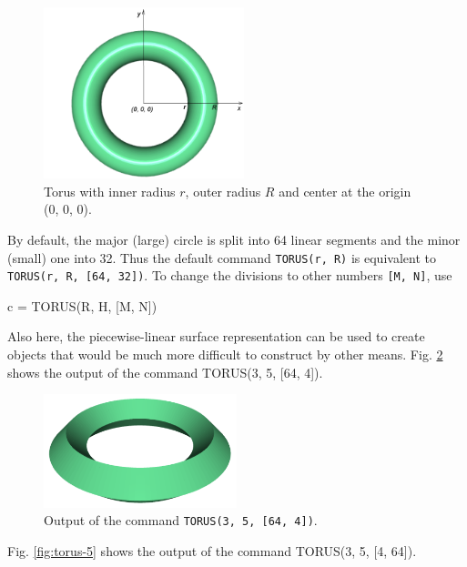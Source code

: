 \begin{figure}[!ht]
\begin{center}
\includegraphics[width=0.52\textwidth]{img/torus-1.png}
\end{center}
\vspace{-4mm}
\caption{Torus with inner radius $r$, outer radius $R$ and center at the origin (0, 0, 0).}
\label{fig:torus-1}
\vspace{-1cm}
\end{figure}
\newpage
\noindent
By default, the major (large) circle is split into 64 linear segments and
the minor (small) one into 32. Thus the default command {\tt TORUS(r, R)} is
equivalent to {\tt TORUS(r, R, [64, 32])}. To change the divisions to other 
numbers {\tt [M, N]}, use

\begin{bluecode}
c = TORUS(R, H, [M, N])
\end{bluecode}
Also here, the piecewise-linear surface representation can be used to
create objects that would be much more difficult to construct by other means.  
Fig. \ref{fig:torus-4} shows the output of the command {TORUS(3, 5, [64, 4])}.

\begin{figure}[!ht]
\begin{center}
\includegraphics[width=0.5\textwidth]{img/torus-4.png}
\end{center}
\vspace{-4mm}
\caption{Output of the command {\tt TORUS(3, 5, [64, 4])}.}
\label{fig:torus-4}
\end{figure}
\noindent
Fig. \ref{fig:torus-5} shows the output of the command {TORUS(3, 5, [4, 64])}.\\

